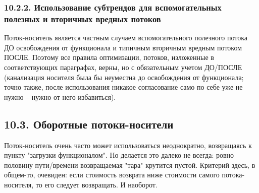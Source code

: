 \documentclass[a4paper,11pt]{article}
\begin{document}
\subsubsection{10.2.2.  Использование субтрендов для вспомогательных полезных
  и вторичных вредных потоков}

Поток-носитель является частным случаем вспомогательного полезного потока ДО
освобождения от функционала и типичным вторичным вредным потоком ПОСЛЕ.
Поэтому все правила оптимизации, потоков, изложенные в соответствующих
параграфах, верны, но с обязательным учетом ДО/ПОСЛЕ (канализация носителя
была бы неуместна до освобождения от функционала; точно также, после
использования никакое согласование само по себе уже не нужно -- нужно от него
избавиться).

\subsection{10.3.  Оборотные потоки-носители}

Поток-носитель очень часто может использоваться неоднократно, возвращаясь к
пункту "загрузки функционалом". Но делается это далеко не всегда: ровно
половину пути/времени возвращаемая "тара" крутится пустой. Критерий здесь, в
общем-то, очевиден: если стоимость возврата ниже стоимости самого
потока-носителя, то его следует возвращать. И наоборот.
\end{document}
